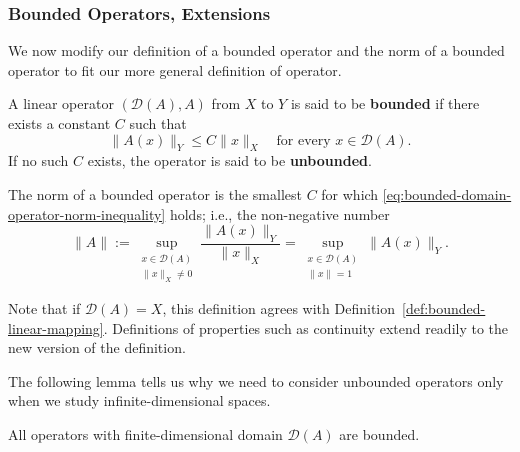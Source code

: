 \subsubsection{Bounded Operators, Extensions}\label{subsec:bounded-operators-extensions}

We now modify our definition of a bounded operator and the norm of a bounded operator to fit our more general definition of operator.

\begin{Definition}
\label{def:bounded-operator-specified-domain}
A linear operator $(\mathcal{D}(A),A)$ from $X$ to $Y$ is said to be \textbf{bounded} if there exists a constant $C$ such that
\begin{equation}\label{eq:bounded-domain-operator-norm-inequality}
\|A(x)\|_Y\leq C\|x\|_X\quad\text{for every }x\in\mathcal{D}(A).
\end{equation}
If no such $C$ exists, the operator is said to be \textbf{unbounded}.

The norm of a bounded operator is the smallest $C$ for which \eqref{eq:bounded-domain-operator-norm-inequality} holds; i.e., the non-negative number
\begin{equation}\label{eq:bounded-domain-operator-norm-definition}
\|A\|:=\sup_{\substack{x\in\mathcal{D}(A)\\\|x\|_X\ne0}}\dfrac{\|A(x)\|_Y}{\|x\|_X}=\sup_{\substack{x\in\mathcal{D}(A)\\\|x\|=1}}\|A(x)\|_Y.
\end{equation}

\end{Definition}

Note that if $\mathcal{D}(A)=X$, this definition agrees with Definition~\ref{def:bounded-linear-mapping}. Definitions of properties such as continuity extend readily to the new version of the definition.

The following lemma tells us why we need to consider unbounded operators only when we study infinite-dimensional spaces.

\begin{Lemma}
\label{lem:finite-dimensional-domain-operators-bounded}
All operators with finite-dimensional domain $\mathcal{D}(A)$ are bounded.
\end{Lemma}

